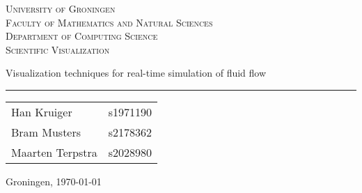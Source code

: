 
\begin{titlepage}

\newcommand{\titleinfo} {Scientific Visualization}
\newcommand{\authorinfo} {Han Kruiger - s1971190 \\ Bram Musters - s2178362 \\ Maarten Terpstra - s2028980}

\center
\textsc{\Large University of Groningen} \\[0.2cm]
\textsc{Faculty of Mathematics and Natural Sciences} \\[0.2cm]
\textsc{Department of Computing Science} \\[0.5cm]
\textsc{\large \titleinfo} \\[1.5cm]


\begin{flushleft}
{\LARGE Visualization techniques for real-time simulation of fluid flow}
{\rule{\linewidth}{0.1mm}}
\end{flushleft}


\begin{flushright}
	\large
	\begin{tabular}{ll}
		Han Kruiger & s1971190 \\
		Bram Musters & s2178362 \\
		Maarten Terpstra & s2028980 \\
	\end{tabular}
\end{flushright}

\vfill

Groningen, \today\\

\end{titlepage}
